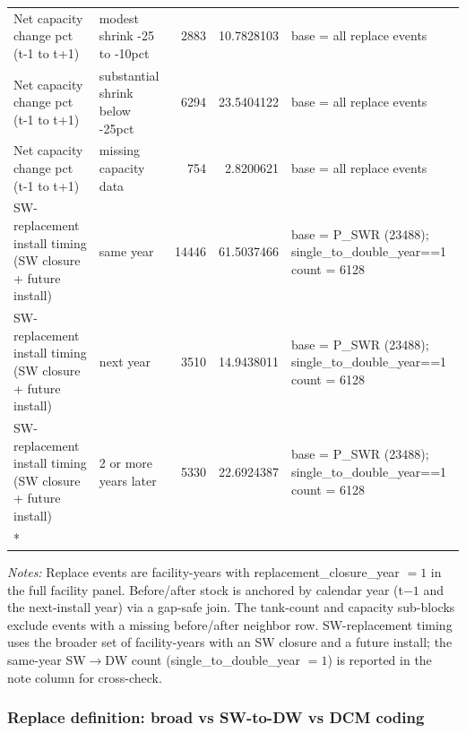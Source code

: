 \documentclass[
  11pt,
]{article}
\begin{document}
\begin{longtable}{llrrl}
Net capacity change pct (t-1 to t+1) & modest shrink -25 to -10pct & 2883 & 10.7828103 & base = all replace events\\
\addlinespace
Net capacity change pct (t-1 to t+1) & substantial shrink below -25pct & 6294 & 23.5404122 & base = all replace events\\
Net capacity change pct (t-1 to t+1) & missing capacity data & 754 & 2.8200621 & base = all replace events\\
SW-replacement install timing (SW closure + future install) & same year & 14446 & 61.5037466 & base = P\_SWR (23488); single\_to\_double\_year==1 count = 6128\\
SW-replacement install timing (SW closure + future install) & next year & 3510 & 14.9438011 & base = P\_SWR (23488); single\_to\_double\_year==1 count = 6128\\
SW-replacement install timing (SW closure + future install) & 2 or more years later & 5330 & 22.6924387 & base = P\_SWR (23488); single\_to\_double\_year==1 count = 6128\\*

\end{longtable}

\endgroup{}

\vspace{0.1cm}
\begin{flushleft}
\footnotesize
\textit{Notes:} Replace events are facility-years with replacement\_closure\_year $=1$ in the full facility panel. Before/after stock is anchored by calendar year (t$-1$ and the next-install year) via a gap-safe join. The tank-count and capacity sub-blocks exclude events with a missing before/after neighbor row. SW-replacement timing uses the broader set of facility-years with an SW closure and a future install; the same-year SW$\rightarrow$DW count (single\_to\_double\_year $=1$) is reported in the note column for cross-check.
\end{flushleft}

\subsubsection{Replace definition: broad vs SW-to-DW vs DCM
coding}\label{sec-t011-a4}
\end{document}
